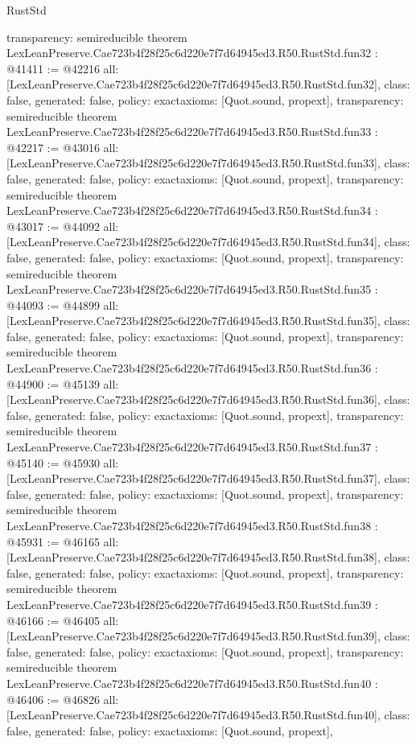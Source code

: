 \begin{lexlean}{RustStd}
\begin{coremodule}
{  transparency: semireducible
}
theorem LexLeanPreserve.Cae723b4f28f25c6d220e7f7d64945ed3.R50.RustStd.fun32 : @41411 := @42216 {
  all: [LexLeanPreserve.Cae723b4f28f25c6d220e7f7d64945ed3.R50.RustStd.fun32],
  class: false,
  generated: false,
  policy: exact{axioms: [Quot.sound, propext]},
  transparency: semireducible
}
theorem LexLeanPreserve.Cae723b4f28f25c6d220e7f7d64945ed3.R50.RustStd.fun33 : @42217 := @43016 {
  all: [LexLeanPreserve.Cae723b4f28f25c6d220e7f7d64945ed3.R50.RustStd.fun33],
  class: false,
  generated: false,
  policy: exact{axioms: [Quot.sound, propext]},
  transparency: semireducible
}
theorem LexLeanPreserve.Cae723b4f28f25c6d220e7f7d64945ed3.R50.RustStd.fun34 : @43017 := @44092 {
  all: [LexLeanPreserve.Cae723b4f28f25c6d220e7f7d64945ed3.R50.RustStd.fun34],
  class: false,
  generated: false,
  policy: exact{axioms: [Quot.sound, propext]},
  transparency: semireducible
}
theorem LexLeanPreserve.Cae723b4f28f25c6d220e7f7d64945ed3.R50.RustStd.fun35 : @44093 := @44899 {
  all: [LexLeanPreserve.Cae723b4f28f25c6d220e7f7d64945ed3.R50.RustStd.fun35],
  class: false,
  generated: false,
  policy: exact{axioms: [Quot.sound, propext]},
  transparency: semireducible
}
theorem LexLeanPreserve.Cae723b4f28f25c6d220e7f7d64945ed3.R50.RustStd.fun36 : @44900 := @45139 {
  all: [LexLeanPreserve.Cae723b4f28f25c6d220e7f7d64945ed3.R50.RustStd.fun36],
  class: false,
  generated: false,
  policy: exact{axioms: [Quot.sound, propext]},
  transparency: semireducible
}
theorem LexLeanPreserve.Cae723b4f28f25c6d220e7f7d64945ed3.R50.RustStd.fun37 : @45140 := @45930 {
  all: [LexLeanPreserve.Cae723b4f28f25c6d220e7f7d64945ed3.R50.RustStd.fun37],
  class: false,
  generated: false,
  policy: exact{axioms: [Quot.sound, propext]},
  transparency: semireducible
}
theorem LexLeanPreserve.Cae723b4f28f25c6d220e7f7d64945ed3.R50.RustStd.fun38 : @45931 := @46165 {
  all: [LexLeanPreserve.Cae723b4f28f25c6d220e7f7d64945ed3.R50.RustStd.fun38],
  class: false,
  generated: false,
  policy: exact{axioms: [Quot.sound, propext]},
  transparency: semireducible
}
theorem LexLeanPreserve.Cae723b4f28f25c6d220e7f7d64945ed3.R50.RustStd.fun39 : @46166 := @46405 {
  all: [LexLeanPreserve.Cae723b4f28f25c6d220e7f7d64945ed3.R50.RustStd.fun39],
  class: false,
  generated: false,
  policy: exact{axioms: [Quot.sound, propext]},
  transparency: semireducible
}
theorem LexLeanPreserve.Cae723b4f28f25c6d220e7f7d64945ed3.R50.RustStd.fun40 : @46406 := @46826 {
  all: [LexLeanPreserve.Cae723b4f28f25c6d220e7f7d64945ed3.R50.RustStd.fun40],
  class: false,
  generated: false,
  policy: exact{axioms: [Quot.sound, propext]},
}
\end{coremodule}
\end{lexlean}
